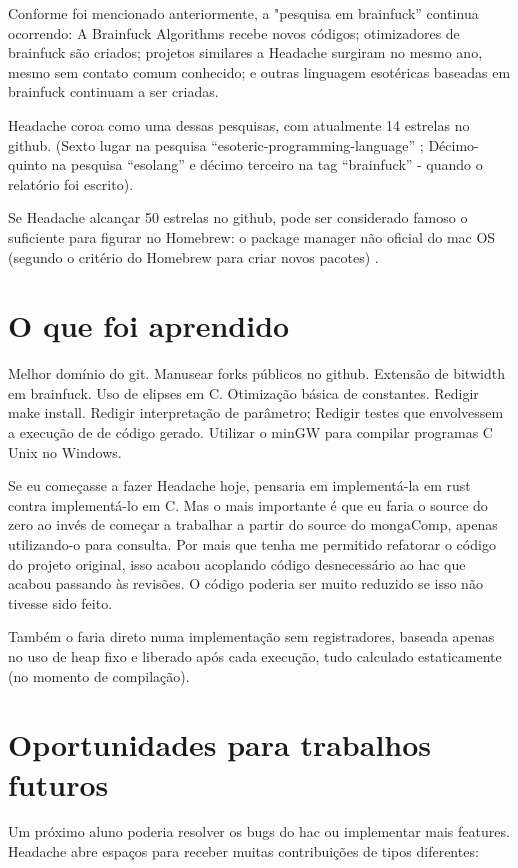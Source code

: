 Conforme foi mencionado anteriormente, a "pesquisa em brainfuck” continua ocorrendo: A Brainfuck Algorithms recebe novos códigos; otimizadores de brainfuck são criados; projetos similares a Headache surgiram no mesmo ano, mesmo sem contato comum conhecido; e outras linguagem esotéricas baseadas em brainfuck continuam a ser criadas.

Headache coroa como uma dessas pesquisas, com atualmente 14 estrelas no github. (Sexto lugar na pesquisa “esoteric-programming-language” ; Décimo-quinto na pesquisa “esolang” e décimo terceiro na tag “brainfuck” - quando o relatório foi escrito).

Se Headache alcançar 50 estrelas no github, pode ser considerado famoso o suficiente para figurar no Homebrew: o package manager não oficial do mac OS (segundo o critério do Homebrew para criar novos pacotes) .

\section{O que foi aprendido}
Melhor domínio do git. Manusear forks públicos no github. Extensão de bitwidth em brainfuck. Uso de elipses em C. Otimização básica de constantes. Redigir make install. Redigir interpretação de parâmetro; Redigir testes que envolvessem a execução de de código gerado. Utilizar o minGW para compilar programas C Unix no Windows.

Se eu começasse a fazer Headache hoje, pensaria em implementá-la em rust contra implementá-lo em C. Mas o mais importante é que eu faria o source do zero ao invés de começar a trabalhar a partir do source do mongaComp, apenas utilizando-o para consulta. Por mais que tenha me permitido refatorar o código do projeto original, isso acabou acoplando código desnecessário ao hac que acabou passando às revisões. O código poderia ser muito reduzido se isso não tivesse sido feito. 

Também o faria direto numa implementação sem registradores, baseada apenas no uso de heap fixo e liberado após cada execução, tudo calculado estaticamente (no momento de compilação).


\section{Oportunidades para trabalhos futuros}
Um próximo aluno poderia resolver os bugs do hac ou implementar mais features. Headache abre espaços para receber muitas contribuições de tipos diferentes: 

